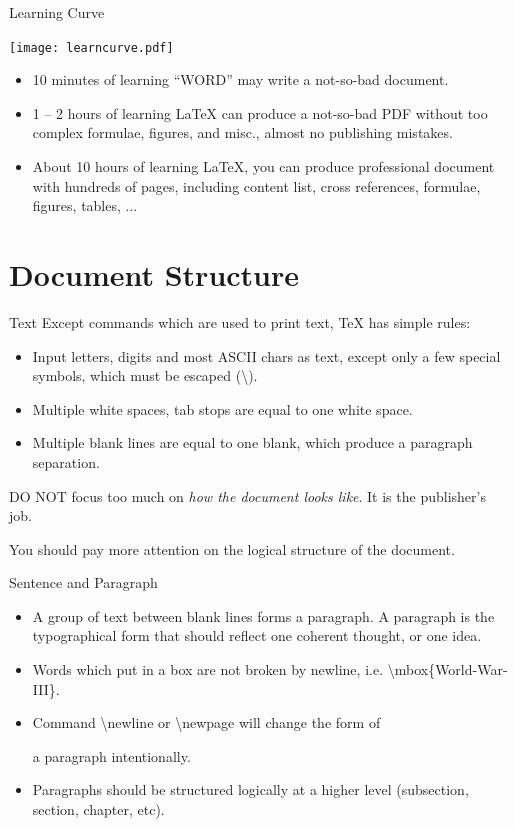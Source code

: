 \documentclass[10pt,t]{beamer}
\begin{document}
\begin{frame}{Learning Curve}
\begin{center}
    \texttt{[image: learncurve.pdf]}
\end{center}

\begin{itemize}
    \item 10 minutes of learning ``WORD'' may write a not-so-bad document.
    \item 1 -- 2 hours of learning \LaTeX{} can produce a not-so-bad
        PDF without too complex formulae, figures, and misc., almost
        no publishing mistakes.
    \item About 10 hours of learning \LaTeX{}, you can produce
        professional document with hundreds
        of pages, including content list, cross references,
        formulae, figures, tables, ...
\end{itemize}
\end{frame}

\section{Document Structure}
\begin{frame}{Text}
    Except commands which are used to print text, \TeX{} has simple rules:
\begin{itemize}
    \item Input letters, digits and most ASCII chars as text, except only
        a few special symbols, which must be escaped
        (\alert{\textbackslash}).
    \item Multiple white spaces, tab stops are equal to one white space.
    \item Multiple blank lines are equal to one blank, which produce
        a paragraph separation.
\end{itemize}

    \alert{DO NOT} focus too much on {\em how the document looks like}.
    It is the publisher's job.

    You should pay more attention on the logical structure of the document.
\end{frame}

\begin{frame}{Sentence and Paragraph}
\begin{itemize}
    \item A group of text between blank lines forms a paragraph.
        A paragraph is the typographical form that should reflect
        one \alert{coherent} thought, or one idea.
    \item Words which put in a box are not broken by newline, i.e.
        \textbackslash mbox\{World-War-III\}.
    \item Command \alert{\textbackslash newline} or
        \alert{\textbackslash newpage} will change the form of

        a paragraph intentionally.
    \item Paragraphs should be structured logically at a higher level
        (\alert{subsection}, \alert{section}, \alert{chapter}, etc).
\end{itemize}
\end{frame}
\end{document}
